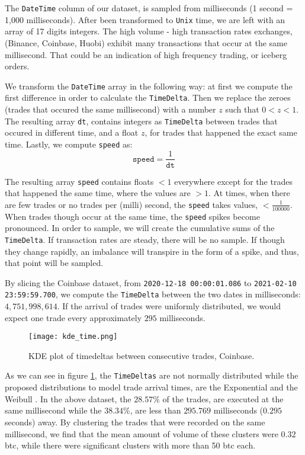 The \texttt{DateTime} column of our dataset, is sampled from milliseconds (1 second = 1,000 milliseconds). After been transformed to \texttt{Unix} time, we are left with an array of 17 digits integers. The high volume - high transaction rates exchanges, (Binance, Coinbase, Huobi) exhibit many transactions that occur at the same millisecond. That could be an indication of high frequency trading, or iceberg orders. 

We transform the \texttt{DateTime} array in the following way: at first we compute the first difference in order to calculate the \texttt{TimeDelta}. Then we replace the zeroes (trades that occured the same millisecond) with a number \(z\) such that \( 0 < z < 1 \). The resulting array \texttt{dt}, contains integers as \texttt{TimeDelta} between trades that occured in different time, and a float \(z\), for trades that happened the exact same time. Lastly, we compute \texttt{speed} as:
\[ \texttt{speed} = \frac{1}{\texttt{dt}} \] 

The resulting array \texttt{speed} contains floats \( < 1 \) everywhere except for the trades that happened the same time, where the values are \( > 1 \). At times, when there are few trades or no trades per (milli) second, the \texttt{speed} takes values, \( < \frac{1}{100000} \). When trades though occur at the same time, the \texttt{speed} spikes become pronounced. In order to sample, we will create the cumulative sums of the \texttt{TimeDelta}. If transaction rates are steady, there will be no sample. If though they change rapidly, an imbalance will transpire in the form of a spike, and thus, that point will be sampled.

By slicing the Coinbase dataset, from \texttt{2020-12-18 00:00:01.086} to \texttt{2021-02-10 23:59:59.700}, we compute the \texttt{TimeDelta} between the two dates in milliseconds: \( 4,751,998,614 \). If the arrival of trades were uniformly distributed, we would expect one trade every approximately \( 295 \) milliseconds.

\begin{figure}[H]
	\centering
    \texttt{[image: kde\_time.png]}
	\caption{KDE plot of timedeltas between consecutive trades, Coinbase.}
    \label{fig:kde_time}
\end{figure}

As we can see in figure \ref{fig:kde_time}, the \texttt{TimeDeltas} are not normally distributed while the proposed distributions to model trade arrival times, are the Exponential and the Weibull \cite{weib}. In the above dataset, the \(28.57\%\) of the trades, are executed at the same millisecond while the \(38.34\%\), are less than \(295.769\) milliseconds (\(0.295\) seconds) away. By clustering the trades that were recorded on the same millisecond, we find that the mean amount of volume of these clusters were \( 0.32 \) btc, while there were significant clusters with more than 50 btc each.

